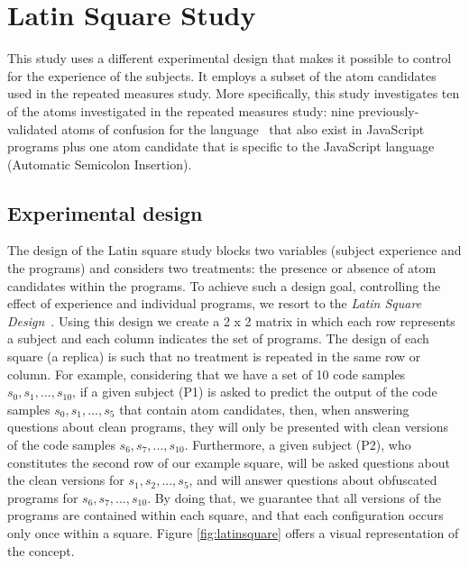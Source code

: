 \section{Latin Square Study}\label{sec:s02}

This study uses a different experimental design that makes it possible to control for the experience of the subjects. It employs a subset of the atom candidates used in the repeated measures study. More specifically, this study investigates ten of the atoms investigated in the repeated measures study: 
nine previously-validated atoms of confusion for the \clang language~\cite{DBLP:conf/sigsoft/GopsteinIYDZYC17} that also exist in JavaScript programs plus one atom candidate that is specific to the JavaScript language (Automatic Semicolon Insertion).  

\subsection{Experimental design}\label{sec:latin-design} 

The design of the Latin square study blocks two variables (subject experience and the programs) and considers two treatments: the presence or absence of atom candidates within the programs. To achieve such a design goal, controlling the effect of experience and individual programs, we resort to the \textit{Latin Square Design}~\cite{Hunter-Experimenters}. Using this design we create a 2 x 2 matrix in which each row represents a subject and each column indicates the set of programs. The design of each square (a replica) is such that no treatment is repeated in the same row or column. For example, considering that we have a set of 10
code samples $s_0, s_1, ..., s_{10}$, if a given subject (P1) is asked to predict the output of the code samples $s_0, s_1, ..., s_5$ that contain atom candidates, then, when answering questions about clean programs, they will only be presented with clean versions of the code samples $s_6, s_7,..., s_{10}$. Furthermore, a given subject (P2), who constitutes the second row of our example square, will be asked questions about the clean versions for $s_1, s_2, ..., s_5$, and will answer questions about obfuscated programs for $s_6, s_7,..., s_{10}$. By doing that, we guarantee that all versions of the programs are contained within each square, and that each configuration occurs only once within a square. Figure \ref{fig:latinsquare} offers a visual representation of the concept.

